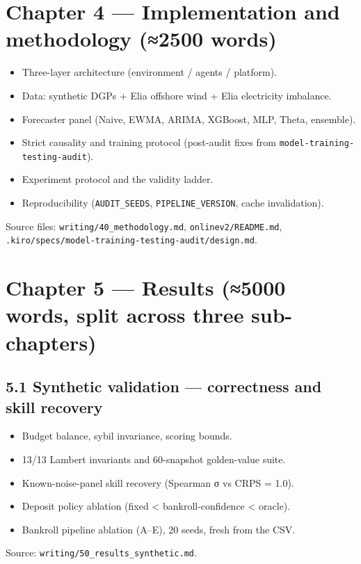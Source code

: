 \documentclass[11pt,a4paper,openany]{report}
\begin{document}
\section{Chapter 4 — Implementation and methodology (≈2500 words)}

\begin{itemize}
  \item Three-layer architecture (environment / agents / platform).
  \item Data: synthetic DGPs + Elia offshore wind + Elia electricity imbalance.
  \item Forecaster panel (Naive, EWMA, ARIMA, XGBoost, MLP, Theta, ensemble).
  \item Strict causality and training protocol (post-audit fixes from
    \texttt{model-training-testing-audit}).
  \item Experiment protocol and the validity ladder.
  \item Reproducibility (\texttt{AUDIT\_SEEDS}, \texttt{PIPELINE\_VERSION}, cache invalidation).
\end{itemize}

Source files: \texttt{writing/40\_methodology.md}, \texttt{onlinev2/README.md},
\texttt{.kiro/specs/model-training-testing-audit/design.md}.

\section{Chapter 5 — Results (≈5000 words, split across three sub-chapters)}

\subsection{5.1 Synthetic validation — correctness and skill recovery}

\begin{itemize}
  \item Budget balance, sybil invariance, scoring bounds.
  \item 13/13 Lambert invariants and 60-snapshot golden-value suite.
  \item Known-noise-panel skill recovery (Spearman σ vs CRPS = 1.0).
  \item Deposit policy ablation (fixed < bankroll-confidence < oracle).
  \item Bankroll pipeline ablation (A–E), 20 seeds, fresh from the CSV.
\end{itemize}

Source: \texttt{writing/50\_results\_synthetic.md}.
\end{document}

